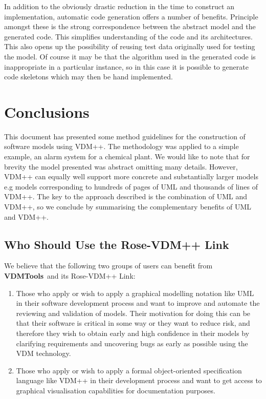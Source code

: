 \documentclass[\pformat,12pt,twoside]{article}
\newcommand{\vdmtools}{\textbf{VDMTools}}
\begin{document}
In addition to the obviously drastic reduction in the time to 
construct an implementation, automatic code generation offers 
a number of benefits. Principle amongst these is the strong correspondence 
between the abstract model and the generated code. This simplifies 
understanding of the code and its architectures. This also opens 
up the possibility of reusing test data originally used for testing 
the model. Of course it may be that the algorithm used in the 
generated code is inappropriate in a particular instance, so 
in this case it is possible to generate code skeletons which 
may then be hand implemented.

\section{Conclusions}

This document has presented some method guidelines for the construction 
of software models using VDM++. The methodology was applied to 
a simple example, an alarm system for a chemical plant. We would 
like to note that for brevity the model presented was abstract 
omitting many details. However, VDM++ can equally well support 
more concrete and substantially larger models e.g models corresponding 
to hundreds of pages of UML and thousands of lines of VDM++. 
The key to the approach described is the combination of UML and 
VDM++, so we conclude by summarising the complementary benefits 
of UML and VDM++.

\subsection{Who Should Use the Rose-VDM++ Link}

We believe that the following two groups of users can benefit 
from \vdmtools\ and its Rose-VDM++ Link:
\begin{enumerate}
\item
Those who apply or wish to apply a graphical modelling notation 
like UML in their software development process and want to improve 
and automate the reviewing and validation of models. Their motivation 
for doing this can be that their software is critical in some 
way or they want to reduce risk, and therefore they wish to obtain 
early and high confidence in their models by clarifying requirements 
and uncovering bugs as early as possible using the VDM technology.
\item
Those who apply or wish to apply a formal object-oriented specification 
language like VDM++ in their development process and want to 
get access to graphical visualisation capabilities for documentation 
purposes. 
\end{enumerate}
\end{document}
